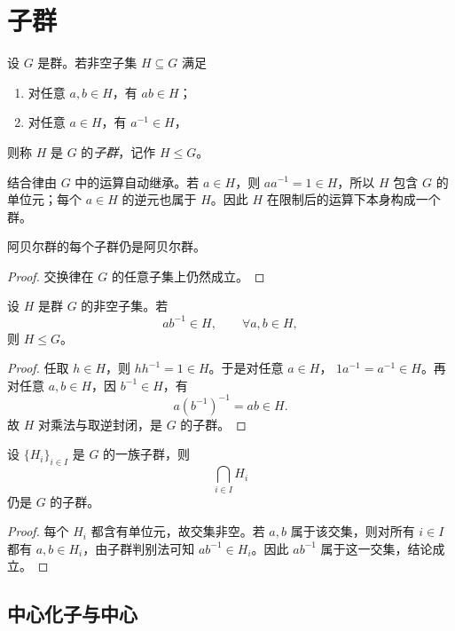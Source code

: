\section{子群}

\begin{definition}[子群]
设 $G$ 是群。若非空子集 $H\subseteq G$ 满足
\begin{enumerate}
  \item 对任意 $a,b\in H$，有 $ab\in H$；
  \item 对任意 $a\in H$，有 $a^{-1}\in H$，
\end{enumerate}
则称 $H$ 是 $G$ 的\emph{子群}，记作 $H\leq G$。
\end{definition}

结合律由 $G$ 中的运算自动继承。若 $a\in H$，则 $aa^{-1}=1\in H$，所以 $H$ 包含 $G$ 的单位元；每个 $a\in H$ 的逆元也属于 $H$。因此 $H$ 在限制后的运算下本身构成一个群。

\begin{proposition}
阿贝尔群的每个子群仍是阿贝尔群。
\end{proposition}

\begin{proof}
交换律在 $G$ 的任意子集上仍然成立。
\end{proof}

\begin{theorem}[子群判别法]
设 $H$ 是群 $G$ 的非空子集。若
\[
  ab^{-1}\in H,\qquad \forall a,b\in H,
\]
则 $H\leq G$。
\end{theorem}

\begin{proof}
任取 $h\in H$，则 $hh^{-1}=1\in H$。于是对任意 $a\in H$，
$1a^{-1}=a^{-1}\in H$。再对任意 $a,b\in H$，因 $b^{-1}\in H$，有
\[
  a(b^{-1})^{-1}=ab\in H.
\]
故 $H$ 对乘法与取逆封闭，是 $G$ 的子群。
\end{proof}

\begin{theorem}[子群的交]
设 $\{H_i\}_{i\in I}$ 是 $G$ 的一族子群，则
\[
  \bigcap_{i\in I}H_i
\]
仍是 $G$ 的子群。
\end{theorem}

\begin{proof}
每个 $H_i$ 都含有单位元，故交集非空。若 $a,b$ 属于该交集，则对所有 $i\in I$ 都有 $a,b\in H_i$，由子群判别法可知 $ab^{-1}\in H_i$。因此 $ab^{-1}$ 属于这一交集，结论成立。
\end{proof}

\subsection{中心化子与中心}

